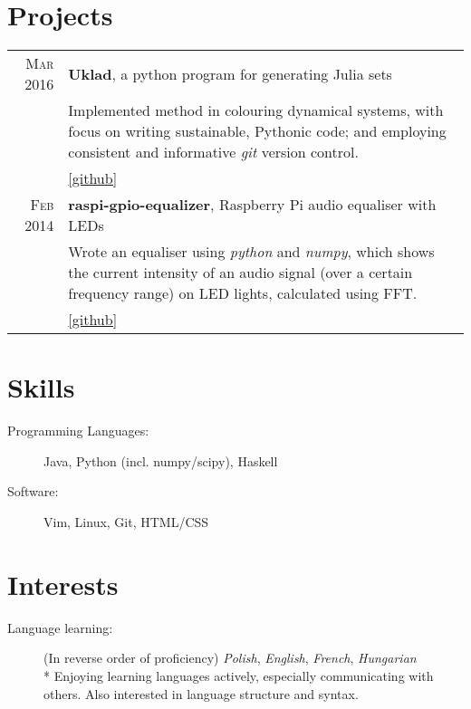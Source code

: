 \documentclass[a4paper,10pt]{article}
\begin{document}
\section{Projects}
\begin{tabular}{r|p{11cm}}
    \textsc{Mar} 2016 & \textbf{Uklad}, a python program for generating Julia sets\\
                      & \footnotesize{Implemented method in colouring dynamical systems, with focus on writing sustainable, Pythonic code; and employing consistent and informative \emph{git} version control.}\\
                      & \href{http://github.com/Karoal/Uklad}{\footnotesize{\hfill[github]}}\\
    \textsc{Feb} 2014 & \textbf{raspi-gpio-equalizer}, Raspberry Pi audio equaliser with LEDs\\
                      & \footnotesize{Wrote an equaliser using \emph{python} and \emph{numpy}, which shows the
                        current intensity of an audio signal (over a certain frequency range) on LED lights, calculated using FFT.}\\
                      & \href{http://github.com/Karoal/raspi-gpio-equalizer}{\footnotesize{\hfill[github]}}
\end{tabular}

\section{Skills}
\begin{description}
    \item [Programming Languages:] Java, Python (incl. numpy/scipy), Haskell
    \item [Software:] Vim, Linux, Git, HTML/CSS
\end{description}

\section{Interests}
\begin{description}
    \item [Language learning:] (In reverse order of proficiency) \emph{Polish}, \emph{English}, \emph{French}, \emph{Hungarian}\\*
        Enjoying learning languages actively, especially communicating with others. Also interested in language structure and syntax.
\end{description}


\end{document}
